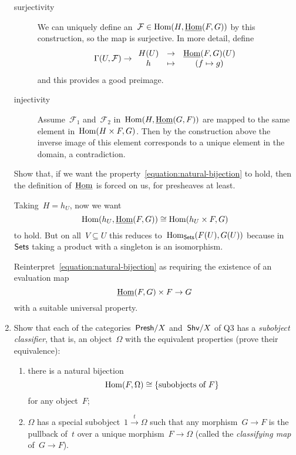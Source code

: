 \documentclass[a4paper,11pt,oneside,openany,article]{memoir}
\begin{document}
\begin{enumerate}
\begin{solution}
      \begin{description}
        \item[surjectivity] We can uniquely define an~$\mathcal{F}\in\operatorname{Hom}(H,\underline{\operatorname{Hom}}(F,G))$ by this construction, so the map is surjective. In more detail, define
          \begin{equation}
            \mathrm{\Gamma}(U,\mathcal{F})\to
            \begin{array}{ccc}
              H(U)&\to&\underline{\operatorname{Hom}}(F,G)(U) \\
              h&\mapsto& \left( f\mapsto g \right)
            \end{array}
          \end{equation}
          and this provides a good preimage.
        \item[injectivity] Assume~$\mathcal{F}_1$ and~$\mathcal{F}_2$ in~$\operatorname{Hom}(H,\underline{\operatorname{Hom}}(G,F))$ are mapped to the same element in~$\operatorname{Hom}(H\times F,G)$. Then by the construction above the inverse image of this element corresponds to a unique element in the domain, a contradiction.
      \end{description}
    \end{solution}

    Show that, if we want the property~\eqref{equation:natural-bijection} to hold, then the definition of~$\underline{\operatorname{Hom}}$ is forced on us, for presheaves at least.

    \begin{solution}
      Taking~$H=h_U$, now we want
      \begin{equation}
        \operatorname{Hom}(h_U,\underline{\operatorname{Hom}}(F,G))\cong\operatorname{Hom}(h_U\times F,G)
      \end{equation}
      to hold. But on all~$V\subseteq U$ this reduces to~$\operatorname{Hom}_{\mathsf{Sets}}(F(U),G(U))$ because in~$\mathsf{Sets}$ taking a product with a singleton is an isomorphism.
    \end{solution}

    Reinterpret~\eqref{equation:natural-bijection} as requiring the existence of an evaluation map
    \begin{equation}
      \underline{\operatorname{Hom}}(F,G)\times F\to G
    \end{equation}
    with a suitable universal property.

  \item Show that each of the categories~$\mathsf{Presh}/X$ and~$\mathsf{Shv}/X$ of Q3 has a \emph{subobject classifier}, that is, an object~$\Omega$ with the equivalent properties (prove their equivalence):
    \begin{enumerate}
      \item\label{subobject-1} there is a natural bijection
        \begin{equation}
          \operatorname{Hom}(F,\Omega)\cong\{\text{subobjects of~$F$}\}
        \end{equation}
        for any object~$F$;
      \item\label{subobject-2} $\Omega$ has a special subobject~$\mathrm{1}\overset{t}{\to}\Omega$ such that any morphism~$G\to F$ is the pullback of~$t$ over a unique morphism~$F\to\Omega$ (called the \emph{classifying map} of~$G\to F$).
    \end{enumerate}


\end{enumerate}
\end{document}
